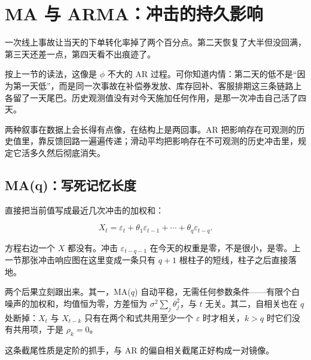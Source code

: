 \section{MA 与 ARMA：冲击的持久影响}
\label{sec:06-Random-Processes/06-ARMA-and-ARIMA/02}

一次线上事故让当天的下单转化率掉了两个百分点。第二天恢复了大半但没回满，第三天还差一点，第四天看不出痕迹了。

按上一节的读法，这像是 \(\phi\) 不大的 AR 过程。可你知道内情：第二天的低不是``因为第一天低''，而是同一次事故在补偿券发放、库存回补、客服排期这三条链路上各留了一天尾巴。历史观测值没有对今天施加任何作用，是那一次冲击自己活了四天。

两种叙事在数据上会长得有点像，在结构上是两回事。AR 把影响存在可观测的历史值里，靠反馈回路一遍遍传递；滑动平均把影响存在不可观测的历史冲击里，规定它活多久然后彻底消失。

\subsection{MA(q)：写死记忆长度}

直接把当前值写成最近几次冲击的加权和：

\[
X_t=\varepsilon_t+\theta_1\varepsilon_{t-1}+\cdots+\theta_q\varepsilon_{t-q}.
\]

方程右边一个 \(X\) 都没有。冲击 \(\varepsilon_{t-q-1}\) 在今天的权重是零，不是很小，是零。上一节那张冲击响应图在这里变成一条只有 \(q+1\) 根柱子的短线，柱子之后直接落地。

两个后果立刻跟出来。其一，MA(\(q\)) 自动平稳，无需任何参数条件——有限个白噪声的加权和，均值恒为零，方差恒为 \(\sigma^2\sum_j\theta_j^2\)，与 \(t\) 无关。其二，自相关也在 \(q\) 处断掉：\(X_t\) 与 \(X_{t-k}\) 只有在两个和式共用至少一个 \(\varepsilon\) 时才相关，\(k>q\) 时它们没有共用项，于是 \(\rho_k=0\)。

这条截尾性质是定阶的抓手，与 AR 的偏自相关截尾正好构成一对镜像。

